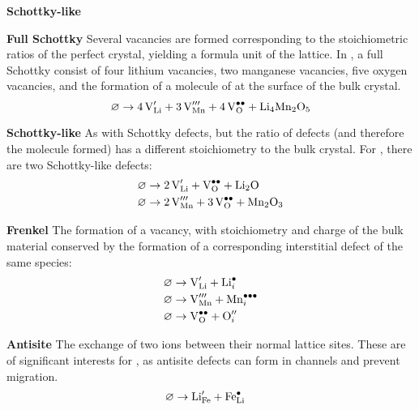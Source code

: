 \begin{labeling}{\textbf{Schottky-like}}
\item[\textbf{Full Schottky}] Several vacancies are formed corresponding to the stoichiometric ratios of the perfect crystal, yielding a formula unit of the lattice.
 In , a full Schottky consist of four lithium vacancies, two manganese vacancies, five oxygen vacancies, and the formation of a molecule of  at the surface of the bulk crystal.
\begin{equation}
\varnothing \rightarrow \ce{4 V^\prime_{Li} +  3 V^{\prime \prime \prime}_{Mn} + 4V^{\bullet \bullet}_{O} + Li4Mn2O5}
\end{equation}
\item[\textbf{Schottky-like}] As with Schottky defects, but the ratio of defects (and therefore the molecule formed) has a different stoichiometry to the bulk crystal.
For , there are two Schottky-like defects:
\begin{align}
\varnothing &\rightarrow \ce{2V^\prime_{Li} + V^{\bullet \bullet}_{O} + Li2O} \\
\varnothing &\rightarrow \ce{2V^{\prime \prime \prime}_{Mn} + 3 V^{\bullet \bullet}_{O} + Mn2O3}
\end{align}
\item[\textbf{Frenkel}] The formation of a vacancy, with stoichiometry and charge of the bulk material conserved by the formation of a corresponding interstitial defect of the same species:
\begin{align}
\varnothing &\rightarrow \ce{V^\prime_{Li} +  Li^{\bullet}_{i}}\\
\varnothing &\rightarrow \ce{V^{\prime \prime \prime}_{Mn} +  Mn^{\bullet\bullet\bullet}_{i}}\\
\varnothing &\rightarrow \ce{V^{\bullet\bullet}_{O} +  O^{\prime \prime}_{i}}
\end{align}
\item[\textbf{Antisite}] The exchange of two ions between their normal lattice sites. These are of significant interests for , as  antisite defects can form in  channels and prevent  migration.
\begin{align}
\varnothing &\rightarrow \ce{Li^\prime_{Fe} +  Fe^{\bullet}_{Li}}
\end{align}
\end{labeling}
